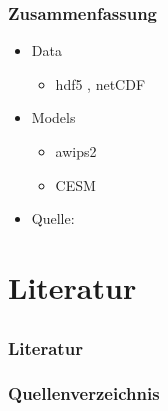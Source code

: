 \documentclass[compress]{beamer}
\begin{document}
\begin{frame}
	\frametitle{Zusammenfassung}

	\begin{itemize}
		\item Data
		
		\begin{itemize}
			\item hdf5 , netCDF
		\end{itemize}
		
		\item Models
		\begin{itemize}
			\item awips2
			\item CESM
		\end{itemize}
		
		\item Quelle: \cite{Quelle2012}
		
	\end{itemize}
\end{frame}

\section{Literatur}
\subsection*{}

\begin{frame}
	\frametitle{Literatur}
    \frametitle{Quellenverzeichnis}

	
	
\end{frame}
\end{document}
